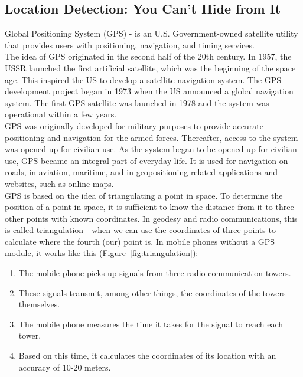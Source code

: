 \documentclass[10pt,oneside,english,a4paper]{article}
\begin{document}
\subsection{Location Detection: You Can't Hide from It} \label{internal:gps}
Global Positioning System (GPS) - is an U.S. Government-owned satellite utility that provides users with positioning, navigation, and timing services\cite{GPS.gov}.
\\The idea of GPS originated in the second half of the 20th century. In 1957, the USSR launched the first artificial satellite, which was the beginning of the space age. This inspired the US to develop a satellite navigation system. The GPS development project began in 1973 when the US announced a global navigation system. The first GPS satellite was launched in 1978 and the system was operational within a few years.
\\GPS was originally developed for military purposes to provide accurate positioning and navigation for the armed forces. Thereafter, access to the system was opened up for civilian use. As the system began to be opened up for civilian use, GPS became an integral part of everyday life. It is used for navigation on roads, in aviation, maritime, and in geopositioning-related applications and websites, such as online maps.
\\GPS is based on the idea of triangulating a point in space. To determine the position of a point in space, it is sufficient to know the distance from it to three other points with known coordinates. In geodesy and radio communications, this is called triangulation - when we can use the coordinates of three points to calculate where the fourth (our) point is. In mobile phones without a GPS module, it works like this (Figure~\ref{fig:triangulation}):

\begin{enumerate}
\item The mobile phone picks up signals from three radio communication towers.
\item These signals transmit, among other things, the coordinates of the towers themselves.
\item The mobile phone measures the time it takes for the signal to reach each tower.
\item Based on this time, it calculates the coordinates of its location with an accuracy of 10-20 meters.
\end{enumerate}
\end{document}
